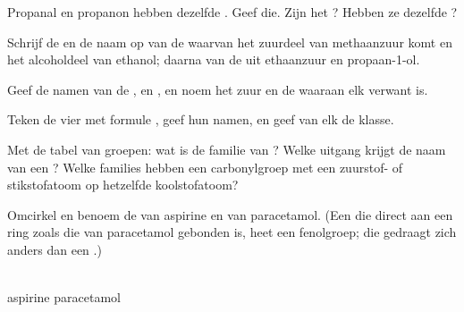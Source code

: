 \begin{exercise}[$\star\star$]\label{exo:g11:functional-groups:7}
Propanal en propanon hebben dezelfde . Geef die. Zijn het
? Hebben ze dezelfde ?
\end{exercise}

\begin{exercise}[$\star\star$]\label{exo:g11:functional-groups:8}
Schrijf de  en de naam op van de  waarvan
het zuurdeel van methaanzuur  komt en het alcoholdeel van
ethanol; daarna van de  uit ethaanzuur en propaan-1-ol.
\end{exercise}

\begin{exercise}[$\star\star$]\label{exo:g11:functional-groups:9}
Geef de namen van de  ,  en
, en noem het zuur en de  waaraan elk verwant is.
\end{exercise}

\begin{exercise}[$\star\star$]\label{exo:g11:functional-groups:10}
Teken de vier  met formule , geef hun namen, en geef
van elk de klasse.
\end{exercise}

\begin{exercise}[$\star\star$]\label{exo:g11:functional-groups:11}
Met de tabel van groepen: wat is de familie van ? Welke
uitgang krijgt de naam van een ? Welke families hebben een
carbonylgroep met een zuurstof- of stikstofatoom op hetzelfde
koolstofatoom?
\end{exercise}

\begin{exercise}[$\star\star\star$]\label{exo:g11:functional-groups:12}
Omcirkel en benoem de  van aspirine en van
paracetamol. (Een  die direct aan een ring zoals die van
paracetamol gebonden is, heet een fenolgroep; die gedraagt zich anders
dan een .)
\begin{center}
\qquad
{}
\\[2pt] \small aspirine \hspace{4.2cm} paracetamol
\end{center}
\end{exercise}

